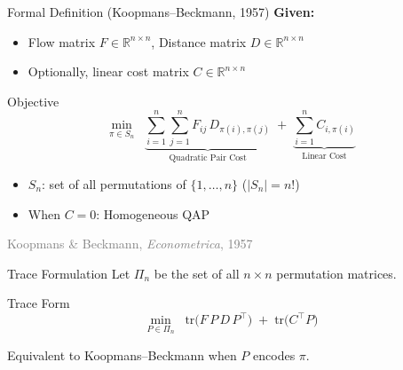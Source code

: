\documentclass[aspectratio=169,11pt]{beamer}
\newcommand{\Sn}{S_n}
\newcommand{\reference}[1]{\hfill{\scriptsize\textcolor{gray}{#1}}}
\begin{document}
\begin{frame}{Formal Definition (Koopmans--Beckmann, 1957)}
\textbf{Given:}
\begin{itemize}
  \item Flow matrix $F \in \mathbb{R}^{n\times n}$, \quad Distance matrix $D \in \mathbb{R}^{n\times n}$
  \item Optionally, linear cost matrix $C \in \mathbb{R}^{n\times n}$
\end{itemize}
\vspace{8pt}
\begin{block}{Objective}
\[
  \min_{\pi\in\Sn}\;\;
  \underbrace{\sum_{i=1}^{n}\sum_{j=1}^{n} F_{ij}\,D_{\pi(i),\pi(j)}}_{\text{Quadratic Pair Cost}}
  \;+\;
  \underbrace{\sum_{i=1}^{n} C_{i,\pi(i)}}_{\text{Linear Cost}}
\]
\end{block}
\vspace{4pt}
\begin{itemize}
  \item $\Sn$: set of all permutations of $\{1,\dots,n\}$ \quad ($|\Sn|=n!$)
  \item When $C=0$: Homogeneous QAP
\end{itemize}
\reference{Koopmans \& Beckmann, \emph{Econometrica}, 1957}
\end{frame}

\begin{frame}{Trace Formulation}
Let $\Pi_n$ be the set of all $n\times n$ \alert{permutation matrices}.
\vspace{6pt}
\begin{block}{Trace Form}
\[
  \min_{P \in \Pi_n}\;\;
  \mathrm{tr}\!\bigl(F\,P\,D\,P^{\!\top}\bigr)
  \;+\;
  \mathrm{tr}\!\bigl(C^{\!\top} P\bigr)
\]
\end{block}
\vspace{6pt}
\centering
{}
\vspace{4pt}

Equivalent to Koopmans--Beckmann when $P$ encodes $\pi$.
\end{frame}
\end{document}
